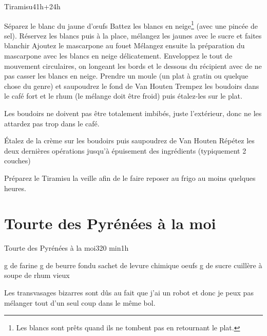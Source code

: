 {\begin{recette}{Tiramisu}{4}{1h+24h}{}
\begin{preparation}
\etape Séparez le blanc du jaune d'œufs
\etape Battez les blancs en neige\footnote{Les 
blancs sont prêts quand ils ne tombent pas en retournant le plat.} (avec une pincée de sel).
\etape Réservez les blancs puis à la place, mélangez les jaunes avec le sucre et faites blanchir
\etape Ajoutez le mascarpone au fouet
\etape Mélangez ensuite la préparation du mascarpone avec les blancs en neige délicatement. Enveloppez le tout de mouvement 
circulaires, on longeant les bords et le dessous du récipient avec de ne pas casser les blancs en neige.
\etape Prendre un moule (un plat à gratin ou quelque chose du genre) et saupoudrez le fond de Van Houten
\etape Trempez les boudoirs dans le café fort et le rhum (le mélange doit être froid) puis étalez-les sur le plat.
\begin{remarque}
Les boudoirs ne doivent pas être totalement imbibés, juste l'extérieur, donc ne les attardez pas trop dans le café.
\end{remarque}
\etape Étalez de la crème sur les boudoirs puis saupoudrez de Van Houten
\etape Répétez les deux dernières opérations jusqu'à épuisement des ingrédients (typiquement 2 couches)
\end{preparation}

\begin{remarque}
Préparez le Tiramisu la veille afin de le faire reposer au frigo au moins quelques heures.
\end{remarque}
\end{recette}

\section{Tourte des Pyrénées à la moi}
\begin{recette}{Tourte des Pyrénées à la moi}{3}{20 min}{1h}
\begin{ingredients}
 g de farine
 g de beurre fondu
 sachet de levure chimique
 oeufs
 g de sucre
 cuillère à soupe de rhum vieux
\end{ingredients}

\begin{remarque}
Les transvasages bizarres sont dûs au fait que j'ai un robot et donc je peux pas mélanger tout d'un seul coup dans le même bol.
\end{remarque}



\end{recette}}
